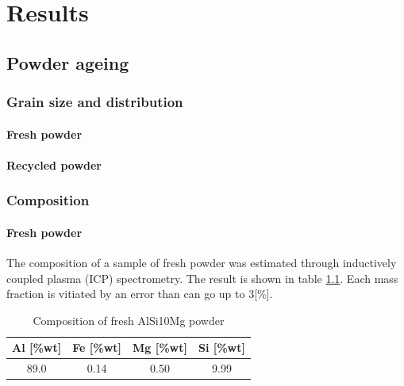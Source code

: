 \chapter{Results}
\label{Chap4}
\section{Powder ageing}

\subsection{Grain size and distribution}
\subsubsection{Fresh powder}

\subsubsection{Recycled powder}
\subsection{Composition}

\subsubsection{Fresh powder}
The composition of a sample of fresh powder was estimated through inductively coupled plasma (ICP) spectrometry. The result is shown in table \ref{tab:compoF}. Each mass fraction is vitiated by an error than can go up to 3[\%]. 
 \begin{center}
\begin{table}[ht]
\centering
\begin{tabular}{|c|c |c |c| }
    \hline
\hline
    Al [\%wt]& Fe [\%wt]&Mg [\%wt]&Si [\%wt]\\
\hline 
\hline   
    89.0&0.14&0.50&9.99\\
    \hline
\end{tabular}

\caption[Composition of fresh AlSi10Mg powder]{Composition of fresh AlSi10Mg powder}
\label{tab:compoF}
\end{table}
 \end{center}


